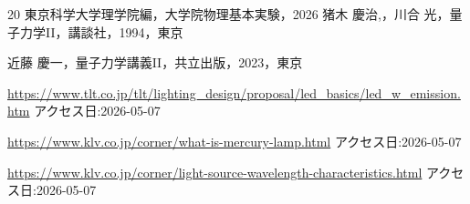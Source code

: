 \documentclass[a4paper,dvipdfmx,10.5pt]{jarticle}
\begin{document}
\begin{thebibliography}{20}
東京科学大学理学院編，大学院物理基本実験，2026
猪木 慶治,，川合 光，量子力学I\hspace{-1.2pt}I，講談社，1994，東京

近藤 慶一，量子力学講義I\hspace{-1.2pt}I，共立出版，2023，東京

\url{https://www.tlt.co.jp/tlt/lighting_design/proposal/led_basics/led_w_emission.htm}
アクセス日:2026-05-07

\url{https://www.klv.co.jp/corner/what-is-mercury-lamp.html}
アクセス日:2026-05-07

\url{https://www.klv.co.jp/corner/light-source-wavelength-characteristics.html}
アクセス日:2026-05-07



\end{thebibliography}
\end{document}
